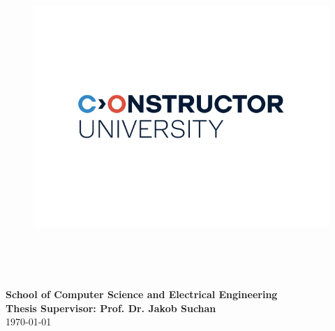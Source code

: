 \begin{titlepage}
\begin{center}
\vfill

\begin{figure}[h]
  \begin{center}
     \includegraphics[height=120mm]{Images/Logos/logo.png}
  \end{center}
\end{figure}
\vspace*{0.2cm}

{\bf\large School of Computer Science and Electrical Engineering } \\
{\bf\large Thesis  Supervisor: Prof. Dr. Jakob Suchan}\\%
{\large \today}

\end{center}

\end{titlepage}

\clearpage

